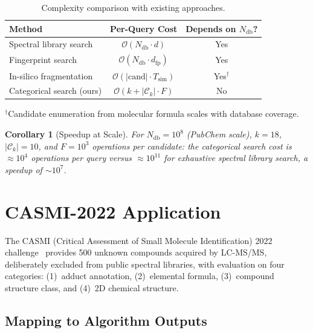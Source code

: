 \documentclass[twocolumn,10pt,a4paper]{article}
\theoremstyle{thmstyle}
\newtheorem{corollary}[theorem]{Corollary}
\theoremstyle{definition}
\theoremstyle{remark}
\newcommand{\calC}{\mathcal{C}}
\begin{document}
\begin{table}[h]
\centering
\caption{Complexity comparison with existing approaches.}
\label{tab:complexity}
\small
\begin{tabular}{@{}lcc@{}}
\toprule
\textbf{Method} & \textbf{Per-Query Cost} & \textbf{Depends on $N_{\mathrm{db}}$?} \\
\midrule
Spectral library search & $\mathcal{O}(N_{\mathrm{db}} \cdot d)$ & Yes \\
Fingerprint search & $\mathcal{O}(N_{\mathrm{db}} \cdot d_{\mathrm{fp}})$ & Yes \\
In-silico fragmentation & $\mathcal{O}(|\mathrm{cand}| \cdot T_{\mathrm{sim}})$ & Yes$^\dagger$ \\
Categorical search (ours) & $\mathcal{O}(k + |\calC_k| \cdot F)$ & No \\
\bottomrule
\end{tabular}

\smallskip
{\footnotesize $^\dagger$Candidate enumeration from molecular formula
scales with database coverage.}
\end{table}

\begin{corollary}[Speedup at Scale]
\label{cor:speedup}
For $N_{\mathrm{db}} = 10^8$ (PubChem scale), $k = 18$,
$|\calC_k| = 10$, and $F = 10^3$ operations per candidate: the
categorical search cost is $\approx 10^4$ operations per query versus
$\approx 10^{11}$ for exhaustive spectral library search, a speedup
of $\sim 10^7$.
\end{corollary}


\section{CASMI-2022 Application}
\label{sec:casmi}

The CASMI (Critical Assessment of Small Molecule Identification) 2022
challenge~\citep{fiehn2022casmi} provides 500 unknown compounds
acquired by LC-MS/MS, deliberately excluded from public spectral
libraries, with evaluation on four categories: (1)~adduct annotation,
(2)~elemental formula, (3)~compound structure class, and
(4)~2D chemical structure.

\subsection{Mapping to Algorithm Outputs}
\end{document}
